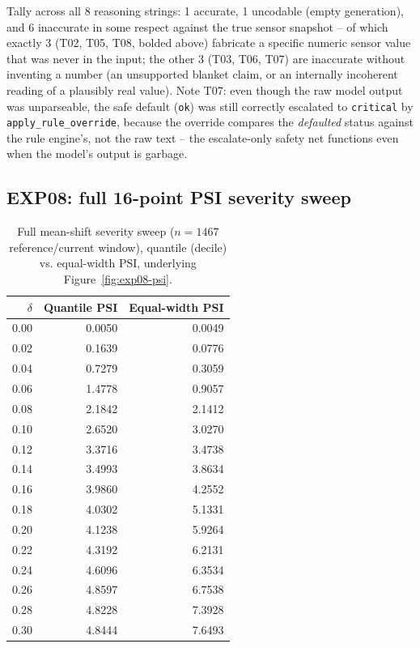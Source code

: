 Tally across all 8 reasoning strings: 1 accurate, 1 uncodable (empty generation), and 6 inaccurate
in some respect against the true sensor snapshot -- of which exactly 3 (T02, T05, T08, bolded
above) fabricate a specific numeric sensor value that was never in the input; the other 3 (T03,
T06, T07) are inaccurate without inventing a number (an unsupported blanket claim, or an
internally incoherent reading of a plausibly real value).
Note T07: even though the raw model output was unparseable, the safe default (\texttt{ok}) was
still correctly escalated to \texttt{critical} by \texttt{apply\_rule\_override}, because the
override compares the \emph{defaulted} status against the rule engine's, not the raw text -- the
escalate-only safety net functions even when the model's output is garbage.

\subsection{EXP08: full 16-point PSI severity sweep}

\begin{table}[h]
\centering
\small
\caption{Full mean-shift severity sweep ($n=1467$ reference/current window), quantile (decile) vs.
equal-width PSI, underlying Figure~\ref{fig:exp08-psi}.}
\label{tab:exp08-full}
\begin{tabular}{@{}rrr@{}}
\toprule
$\delta$ & Quantile PSI & Equal-width PSI \\
\midrule
0.00 & 0.0050 & 0.0049 \\
0.02 & 0.1639 & 0.0776 \\
0.04 & 0.7279 & 0.3059 \\
0.06 & 1.4778 & 0.9057 \\
0.08 & 2.1842 & 2.1412 \\
0.10 & 2.6520 & 3.0270 \\
0.12 & 3.3716 & 3.4738 \\
0.14 & 3.4993 & 3.8634 \\
0.16 & 3.9860 & 4.2552 \\
0.18 & 4.0302 & 5.1331 \\
0.20 & 4.1238 & 5.9264 \\
0.22 & 4.3192 & 6.2131 \\
0.24 & 4.6096 & 6.3534 \\
0.26 & 4.8597 & 6.7538 \\
0.28 & 4.8228 & 7.3928 \\
0.30 & 4.8444 & 7.6493 \\
\bottomrule
\end{tabular}
\end{table}

